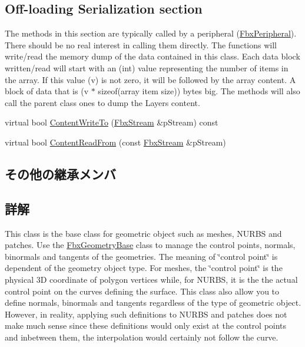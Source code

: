\subsection*{Off-\/loading Serialization section}
\label{_amgrpe1aaec84f361fca191ade63ad8637b37}%
 The methods in this section are typically called by a peripheral (\hyperlink{class_fbx_peripheral}{Fbx\+Peripheral}). There should be no real interest in calling them directly. The functions will write/read the memory dump of the data contained in this class. Each data block written/read will start with an (int) value representing the number of items in the array. If this value (v) is not zero, it will be followed by the array content. A block of data that is (v $\ast$ sizeof(array item size)) bytes big. The methods will also call the parent class ones to dump the Layers content. \begin{DoxyCompactItemize}
\item 
virtual bool \hyperlink{class_fbx_geometry_base_a7b80ccbcd2b15bbedbe7dd7e0739a3b3}{Content\+Write\+To} (\hyperlink{class_fbx_stream}{Fbx\+Stream} \&p\+Stream) const
\item 
virtual bool \hyperlink{class_fbx_geometry_base_a6d34ab23d253b07cac24267177096c1a}{Content\+Read\+From} (const \hyperlink{class_fbx_stream}{Fbx\+Stream} \&p\+Stream)
\end{DoxyCompactItemize}
\subsection*{その他の継承メンバ}


\subsection{詳解}
This class is the base class for geometric object such as meshes, N\+U\+R\+BS and patches. Use the \hyperlink{class_fbx_geometry_base}{Fbx\+Geometry\+Base} class to manage the control points, normals, binormals and tangents of the geometries. The meaning of \char`\"{}control point\char`\"{} is dependent of the geometry object type. For meshes, the \char`\"{}control point\char`\"{} is the physical 3D coordinate of polygon vertices while, for N\+U\+R\+BS, it is the the actual control point on the curves defining the surface. This class also allow you to define normals, binormals and tangents regardless of the type of geometric object. However, in reality, applying such definitions to N\+U\+R\+BS and patches does not make much sense since these definitions would only exist at the control points and inbetween them, the interpolation would certainly not follow the curve.

